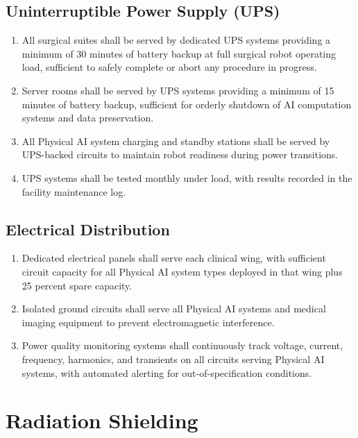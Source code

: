 \documentclass[11pt,letterpaper]{article}
\begin{document}
\subsection{Uninterruptible Power Supply (UPS)}

\begin{enumerate}[label=(\alph*)]
\item All surgical suites shall be served by dedicated UPS systems providing a
  minimum of 30 minutes of battery backup at full surgical robot operating
  load, sufficient to safely complete or abort any procedure in progress.

\item Server rooms shall be served by UPS systems providing a minimum of 15
  minutes of battery backup, sufficient for orderly shutdown of AI computation
  systems and data preservation.

\item All Physical AI system charging and standby stations shall be served by
  UPS-backed circuits to maintain robot readiness during power transitions.

\item UPS systems shall be tested monthly under load, with results recorded
  in the facility maintenance log.
\end{enumerate}

\subsection{Electrical Distribution}

\begin{enumerate}[label=(\alph*)]
\item Dedicated electrical panels shall serve each clinical wing, with
  sufficient circuit capacity for all Physical AI system types deployed in
  that wing plus 25 percent spare capacity.

\item Isolated ground circuits shall serve all Physical AI systems and medical
  imaging equipment to prevent electromagnetic interference.

\item Power quality monitoring systems shall continuously track voltage, current,
  frequency, harmonics, and transients on all circuits serving Physical AI
  systems, with automated alerting for out-of-specification conditions.
\end{enumerate}

\section{Radiation Shielding}
\end{document}
